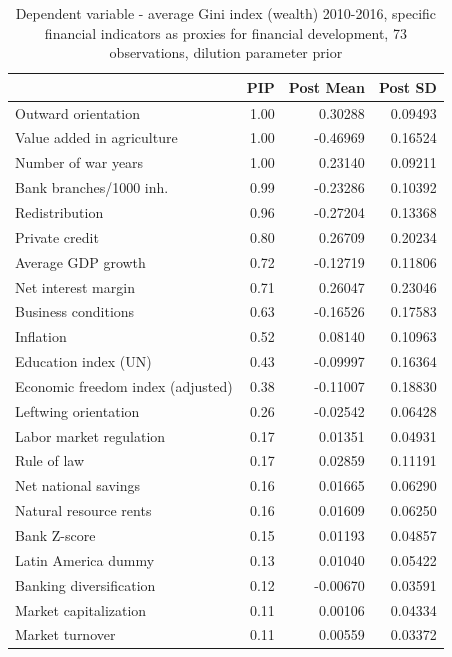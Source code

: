 \begin{refsection}
\begin{subappendices}
    \begin{table}[!ht]
    \footnotesize
    \centering
    \caption{Dependent variable - average Gini index (wealth) 2010-2016, specific financial indicators as proxies for financial development, 73 observations, dilution parameter prior}
    \label{ch3table:res5}
    \begin{tabular}{lrrr}
      \toprule
     & \ac{PIP} & Post Mean & Post SD \\ 
      \midrule
      Outward orientation & 1.00 & 0.30288 & 0.09493 \\ 
      Value added in agriculture & 1.00 & -0.46969 & 0.16524 \\ 
      Number of war years & 1.00 & 0.23140 & 0.09211 \\ 
      Bank branches/1000 inh. & 0.99 & -0.23286 & 0.10392 \\ 
      Redistribution & 0.96 & -0.27204 & 0.13368 \\ 
      Private credit & 0.80 & 0.26709 & 0.20234 \\ 
      Average GDP growth & 0.72 & -0.12719 & 0.11806 \\ 
      Net interest margin & 0.71 & 0.26047 & 0.23046 \\ 
      Business conditions & 0.63 & -0.16526 & 0.17583 \\ 
      Inflation & 0.52 & 0.08140 & 0.10963 \\ 
      Education index (UN) & 0.43 & -0.09997 & 0.16364 \\ 
      Economic freedom index (adjusted) & 0.38 & -0.11007 & 0.18830 \\ 
      Leftwing orientation & 0.26 & -0.02542 & 0.06428 \\ 
      Labor market regulation & 0.17 & 0.01351 & 0.04931 \\ 
      Rule of law & 0.17 & 0.02859 & 0.11191 \\ 
      Net national savings & 0.16 & 0.01665 & 0.06290 \\ 
      Natural resource rents & 0.16 & 0.01609 & 0.06250 \\ 
      Bank Z-score & 0.15 & 0.01193 & 0.04857 \\ 
      Latin America dummy & 0.13 & 0.01040 & 0.05422 \\ 
      Banking diversification & 0.12 & -0.00670 & 0.03591 \\ 
      Market capitalization & 0.11 & 0.00106 & 0.04334 \\ 
      Market turnover & 0.11 & 0.00559 & 0.03372 \\ 

\end{tabular}
\end{table}
\end{subappendices}
\end{refsection}
